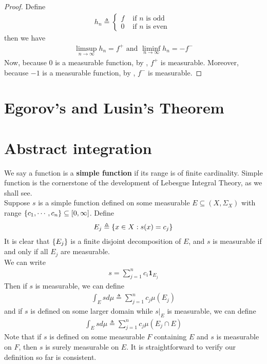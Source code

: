 \documentclass{report}
\begin{document}
\begin{proof}
Define  
\begin{align*}
h_n\triangleq \begin{cases}
  f& \text{ if $n$ is odd }\\
  0& \text{ if $n$ is even }
\end{cases}
\end{align*}
then we have 
\begin{align*}
\limsup_{n\to\infty} h_n=f^+\text{ and }\liminf_{n\to\infty} h_n=-f^-
\end{align*}
Now, because $0$ is a measurable function, by , $f^+$ is measurable. Moreover, because $-1$ is a measurable function, by  , $f^-$ is measurable.
\end{proof}
\section{Egorov's and Lusin's Theorem}
\section{Abstract integration} 
\begin{mdframed}
We say a function is a \textbf{simple function} if its range is of finite cardinality. Simple function is the cornerstone of the development of Lebesgue Integral Theory, as we shall see.\\

Suppose $s$ is a simple function defined on some measurable $E\subseteq (X,\Sigma_X)$ with range $\{ c_1,\cdots ,c_n \}\subseteq [0,\infty]$. Define 
\begin{align*}
E_j\triangleq \{ x \in X: s(x)=c_j \}
\end{align*}
It is clear that $\{ E_j \}$ is a finite disjoint decomposition of $E$, and $s$ is measurable if and only if all $E_j$ are measurable.\\

We can write
\begin{align*}
s= \sum_{j=1}^n c_i \textbf{1}_{E_j}
\end{align*}
Then if $s$ is measurable, we can define
\begin{align*}
\int_E s d\mu \triangleq \sum_{j=1}^n c_j \mu (E_j)
\end{align*}
and if $s$ is defined on some larger domain while $s|_E$ is measurable, we can define 
\begin{align*}
\int_E s d\mu \triangleq \sum_{j=1}^n c_j\mu (E_j\cap E)
\end{align*}
Note that if $s$ is defined on some measurable $F$ containing  $E$ and  $s$ is measurable on $F$, then $s$ is surely measurable on $E$. It is straightforward to verify our definition so far is consistent.
\end{mdframed}
\end{document}

